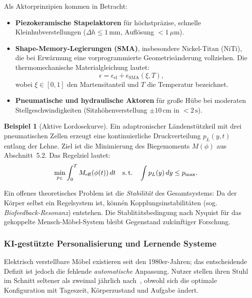 ﻿\documentclass[a4paper,12pt]{article}
\theoremstyle{definition}
\newtheorem{beispiel}{Beispiel}
\begin{document}
Als Aktorprinzipien kommen in Betracht:
\begin{itemize}
	\item \textbf{Piezokeramische Stapelaktoren} f\"{u}r h\"{o}chstpr\"{a}zise, schnelle
	      Kleinhubverstellungen ($\Delta h \leq 1\,\mathrm{mm}$, Aufl\"{o}sung $<1\,\mu\mathrm{m}$).
	\item \textbf{Shape-Memory-Legierungen (SMA)}, insbesondere Nickel-Titan (NiTi),
	      die bei Erw\"{a}rmung eine vorprogrammierte Geometrie\"{a}nderung vollziehen.
	      Die thermomechanische Materialgleichung lautet:
	      \[
	      	\epsilon = \epsilon_{\mathrm{el}} + \epsilon_{\mathrm{SMA}}(\xi, T),
	      \]
	      wobei $\xi \in [0, 1]$ den Martensitanteil und $T$ die Temperatur bezeichnet.
	\item \textbf{Pneumatische und hydraulische Aktoren} f\"{u}r gro\ss{}e H\"{u}be bei
	      moderaten Stellgeschwindigkeiten (Sitzh\"{o}henverstellung $\pm 10\,\mathrm{cm}$
	      in $< 2\,\mathrm{s}$).
\end{itemize}

\begin{beispiel}[Aktive Lordosekurve]
	Ein adaptronischer L\"{a}ndenst\"{u}tzkeil mit drei pneumatischen Zellen erzeugt eine
	kontinuierliche Druckverteilung $p_L(y, t)$ entlang der Lehne. Ziel ist die
	Minimierung des Biegemoments $M(\phi)$ aus Abschnitt~5.2. Das Regelziel lautet:
	\[
		\min_{p_L} \int_0^T M_{\mathrm{eff}}(\phi(t))\,dt
		\quad \text{s.\,t.} \quad
		\int p_L(y)\,dy \leq p_{\max}.
	\]
\end{beispiel}

Ein offenes theoretisches Problem ist die \emph{Stabilit\"{a}t} des Gesamtsystems:
Da der K\"{o}rper selbst ein Regelsystem ist, k\"{o}nn\'{e}n Kopplungsinstabilit\"{a}ten
(sog. \emph{Biofeedback-Resonanz}) entstehen. Die Stablit\"{a}tsbedingung nach Nyquist
f\"{u}r das gekoppelte Mensch-M\"{o}bel-System bleibt Gegenstand zuk\"{u}nftiger Forschung.

\subsubsection{KI-gest\"{u}tzte Personalisierung und Lernende Systeme}

Elektrisch verstellbare M\"{o}bel existieren seit den 1980er-Jahren; das entscheidende
Defizit ist jedoch die fehlende \emph{automatische} Anpassung. Nutzer stellen ihren
Stuhl im Schnitt seltener als zweimal j\"{a}hrlich nach~\cite{ISO9241}, obwohl sich
die optimale Konfiguration mit Tageszeit, K\"{o}rperzustand und Aufgabe \"{a}ndert.
\end{document}
